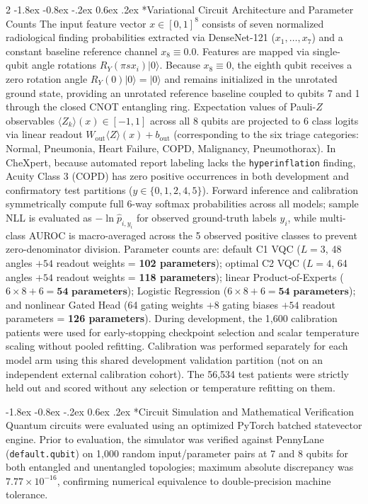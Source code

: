 \documentclass[10pt,a4paper,twoside]{article}
\makeatletter
\renewcommand{\subsection}{\@startsection{subsection}{2}{\z@}%
  {-1.8ex \@plus -0.8ex \@minus -.2ex}%
  {0.6ex \@plus.2ex}%
  {\normalfont\normalsize\sffamily\bfseries\color{naturedark}}}
\makeatother
\begin{document}
\begin{multicols}{2}
\subsection*{Variational Circuit Architecture and Parameter Counts}
The input feature vector $x \in [0, 1]^8$ consists of seven normalized radiological finding probabilities extracted via DenseNet-121 ($x_1, \dots, x_7$) and a constant baseline reference channel $x_8 \equiv 0.0$. Features are mapped via single-qubit angle rotations $R_Y(\pi s x_i)|0\rangle$. Because $x_8 \equiv 0$, the eighth qubit receives a zero rotation angle $R_Y(0)|0\rangle = |0\rangle$ and remains initialized in the unrotated ground state, providing an unrotated reference baseline coupled to qubits 7 and 1 through the closed CNOT entangling ring. Expectation values of Pauli-$Z$ observables $\langle Z_k \rangle(x) \in [-1, 1]$ across all 8 qubits are projected to 6 class logits via linear readout $W_{\text{out}} \langle Z \rangle(x) + b_{\text{out}}$ (corresponding to the six triage categories: Normal, Pneumonia, Heart Failure, COPD, Malignancy, Pneumothorax). In CheXpert, because automated report labeling lacks the \texttt{hyperinflation} finding, Acuity Class 3 (COPD) has zero positive occurrences in both development and confirmatory test partitions ($y \in \{0, 1, 2, 4, 5\}$). Forward inference and calibration symmetrically compute full 6-way softmax probabilities across all models; sample NLL is evaluated as $-\ln \hat{p}_{i, y_i}$ for observed ground-truth labels $y_i$, while multi-class AUROC is macro-averaged across the 5 observed positive classes to prevent zero-denominator division. Parameter counts are: default C1 VQC ($L=3$, 48 angles $+ 54$ readout weights = \textbf{102 parameters}); optimal C2 VQC ($L=4$, 64 angles $+ 54$ readout weights = \textbf{118 parameters}); linear Product-of-Experts ($6 \times 8 + 6 = \mathbf{54\text{ parameters}}$); Logistic Regression ($6 \times 8 + 6 = \mathbf{54\text{ parameters}}$); and nonlinear Gated Head (64 gating weights $+ 8$ gating biases $+ 54$ readout parameters = \textbf{126 parameters}). During development, the 1,600 calibration patients were used for early-stopping checkpoint selection and scalar temperature scaling \cite{guo2017} without pooled refitting. Calibration was performed separately for each model arm using this shared development validation partition (not on an independent external calibration cohort). The 56,534 test patients were strictly held out and scored without any selection or temperature refitting on them.

\subsection*{Circuit Simulation and Mathematical Verification}
Quantum circuits were evaluated using an optimized PyTorch batched statevector engine. Prior to evaluation, the simulator was verified against PennyLane (\texttt{default.qubit}) on 1,000 random input/parameter pairs at 7 and 8 qubits for both entangled and unentangled topologies; maximum absolute discrepancy was $7.77 \times 10^{-16}$, confirming numerical equivalence to double-precision machine tolerance.


\end{multicols}
\end{document}
